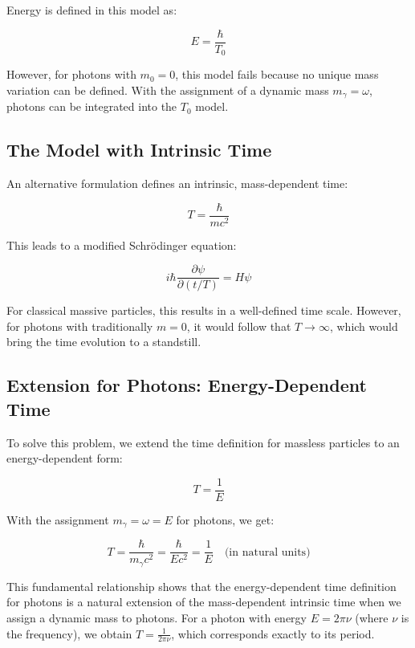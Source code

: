 \documentclass[a4paper,12pt]{article}
\begin{document}
	Energy is defined in this model as:
	
	\begin{equation}
		E = \frac{\hbar}{T_0}
	\end{equation}
	
	However, for photons with $m_0 = 0$, this model fails because no unique mass variation can be defined.  With the assignment of a dynamic mass $m_{\gamma} = \omega$, photons can be integrated into the $T_0$ model.
	
	\subsection{The Model with Intrinsic Time}
	An alternative formulation defines an intrinsic, mass-dependent time:
	
	\begin{equation}
		T = \frac{\hbar}{mc^2}
	\end{equation}
	
	This leads to a modified Schrödinger equation:
	
	\begin{equation}
		i\hbar\frac{\partial\psi}{\partial (t/T)} = H\psi
	\end{equation}
	
	For classical massive particles, this results in a well-defined time scale.  However, for photons with traditionally $m = 0$, it would follow that $T \rightarrow \infty$, which would bring the time evolution to a standstill.
	
	\subsection{Extension for Photons: Energy-Dependent Time}
	To solve this problem, we extend the time definition for massless particles to an energy-dependent form:
	
	\begin{equation}
		T = \frac{1}{E}
	\end{equation}
	
	With the assignment $m_{\gamma} = \omega = E$ for photons, we get:
	
	\begin{equation}
		T = \frac{\hbar}{m_{\gamma}c^2} = \frac{\hbar}{Ec^2} = \frac{1}{E} \quad \text{(in natural units)}
	\end{equation}
	
	This fundamental relationship shows that the energy-dependent time definition for photons is a natural extension of the mass-dependent intrinsic time when we assign a dynamic mass to photons. For a photon with energy $E = 2\pi\nu$ (where $\nu$ is the frequency), we obtain $T = \frac{1}{2\pi\nu}$, which corresponds exactly to its period.
	
\end{document}
